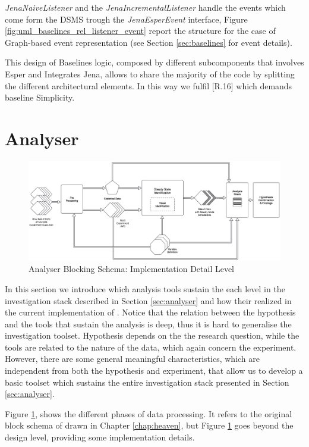 \textit{JenaNaiveListener} and the  \textit{JenaIncrementalListener} handle the events which come form the DSMS trough the \textit{JenaEsperEvent} interface, Figure \ref{fig:uml_baselines_rel_listener_event} report  the structure for the case of Graph-based event representation (see Section \ref{sec:baselines} for event details). 

This design of Baselines logic, composed by different subcomponents that involves Esper and Integrates Jena, allows to share the majority of the code by splitting the different architectural elements. In this way we fulfil [R.16] which demands baseline Simplicity.


\section{Analyser}\label{sec:analyser-impl}

\begin{figure}[tbh]
  \centering
	\includegraphics[width=\linewidth]{images/analyser-block-schema-impl}
	\caption{Analyser Blocking Schema: Implementation Detail Level} 
  	\label{fig:analyser-block-schema-impl}
\end{figure}

\noindent In this section we introduce which analysis tools sustain the each level in the investigation stack described in Section \ref{sec:analyser} and how their realized in the current implementation of \name. Notice that the relation between the hypothesis and the tools that sustain the analysis is deep, thus it is hard to generalise the investigation toolset. Hypothesis depends on the the research question, while the tools are related to the nature of the data, which again concern the experiment.  However, there are some general meaningful characteristics, which are independent from both the hypothesis and experiment, that allow us to develop a basic toolset which sustains the entire investigation stack presented in Section \ref{sec:analyser}.

Figure \ref{fig:analyser-block-schema-impl}, shows the different phases of data processing. It refers to the original block schema of drawn in Chapter \ref{chap:heaven}, but Figure \ref{fig:analyser-block-schema-impl} goes beyond the design level, providing some implementation details. 

